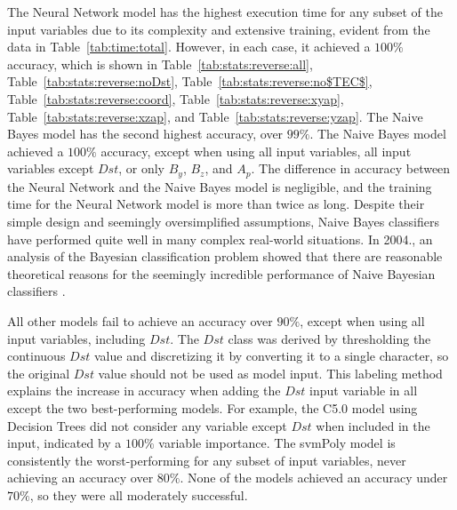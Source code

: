 \documentclass[sn-mathphys-num]{sn-jnl}%
\begin{document}
The Neural Network model has the highest execution time for any subset of the input variables due to its complexity and extensive training, evident from the data in Table~\ref{tab:time:total}. However, in each case, it achieved a $100\%$ accuracy, which is shown in Table~\ref{tab:stats:reverse:all}, Table~\ref{tab:stats:reverse:noDst}, Table~\ref{tab:stats:reverse:no$TEC$}, Table~\ref{tab:stats:reverse:coord}, Table~\ref{tab:stats:reverse:xyap}, Table~\ref{tab:stats:reverse:xzap}, and Table~\ref{tab:stats:reverse:yzap}. The Naive Bayes model has the second highest accuracy, over $99\%$. The Naive Bayes model achieved a $100\%$ accuracy, except when using all input variables, all input variables except $Dst$, or only $B_{y}$, $B_{z}$, and $A_{p}$. The difference in accuracy between the Neural Network and the Naive Bayes model is negligible, and the training time for the Neural Network model is more than twice as long. Despite their simple design and seemingly oversimplified assumptions, Naive Bayes classifiers have performed quite well in many complex real-world situations. In 2004., an analysis of the Bayesian classification problem showed that there are reasonable theoretical reasons for the seemingly incredible performance of Naive Bayesian classifiers \cite{Zhang2004}.

All other models fail to achieve an accuracy over $90\%$, except when using all input variables, including $Dst$. The $Dst$ class was derived by thresholding the continuous $Dst$ value and discretizing it by converting it to a single character, so the original $Dst$ value should not be used as model input. This labeling method explains the increase in accuracy when adding the $Dst$ input variable in all except the two best-performing models. For example, the C5.0 model using Decision Trees did not consider any variable except $Dst$ when included in the input, indicated by a $100\%$ variable importance. The svmPoly model is consistently the worst-performing for any subset of input variables, never achieving an accuracy over $80\%$. None of the models achieved an accuracy under $70\%$, so they were all moderately successful.
\end{document}
